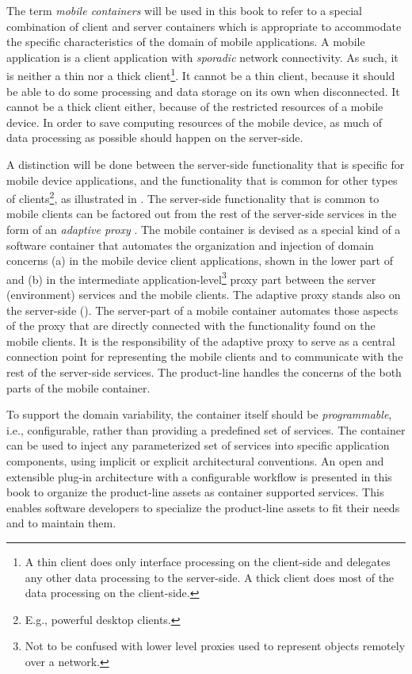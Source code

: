 The term \textit{mobile containers} will be used in this book to refer to a special combination of client and server containers which is appropriate to accommodate the specific characteristics of the domain of mobile applications. A mobile application is a client application with \textit{sporadic} network connectivity. As such, it is neither a thin nor a thick client\footnote{A thin client does only interface processing on the client-side and delegates any other data processing to the server-side. A thick client does most of the data processing on the client-side.}. It cannot be a thin client, because it should be able to do some processing and data storage on its own when disconnected. It cannot be a thick client either, because of the restricted resources of a mobile device. In order to save computing resources of the mobile device, as much of data processing as possible should happen on the server-side.

A distinction will be done between the server-side functionality that is specific for mobile device applications, and the functionality that is common for other types of clients\footnote{E.g., powerful desktop clients.}, as illustrated in . The server-side functionality that is common to mobile clients can be factored out from the rest of the server-side services in the form of an \textit{adaptive proxy} \cite{fox96adapting}. The mobile container is devised as a special kind of a software container \cite{server.patterns.02} that automates the organization and injection of domain concerns (a) in the mobile device client applications, shown in the lower part of  and (b) in the intermediate application-level\footnote{Not to be confused with lower level proxies used to represent objects remotely over a network.} proxy part between the server (environment) services and the mobile clients. The adaptive proxy stands also on the server-side (). The server-part of a mobile container automates those aspects of the proxy that are directly connected with the functionality found on the mobile clients. It is the responsibility of the adaptive proxy to serve as a central connection point for representing the mobile clients and to communicate with the rest of the server-side services. The product-line handles the concerns of the both parts of the mobile container. 

To support the domain variability, the container itself should be \textit{programmable}, i.e., configurable, rather than providing a predefined set of services. The container can be used to inject any parameterized set of services into specific application components, using implicit or explicit architectural conventions. An open and extensible plug-in architecture with a configurable workflow is presented in this book  to organize the product-line assets as container supported services. This enables software developers to specialize the product-line assets to fit their needs and to maintain them.

